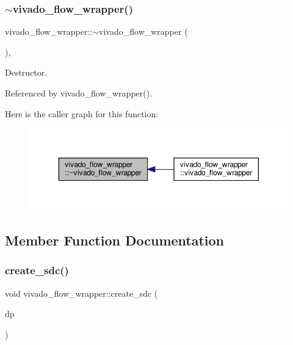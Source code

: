 \subsubsection{\texorpdfstring{$\sim$vivado\+\_\+flow\+\_\+wrapper()}{~vivado\_flow\_wrapper()}}
{\footnotesize\ttfamily vivado\+\_\+flow\+\_\+wrapper\+::$\sim$vivado\+\_\+flow\+\_\+wrapper (\begin{DoxyParamCaption}{ }\end{DoxyParamCaption})\hspace{0.3cm}{\ttfamily [override]}, {\ttfamily [default]}}



Destructor. 



Referenced by vivado\+\_\+flow\+\_\+wrapper().

Here is the caller graph for this function\+:
\nopagebreak
\begin{figure}[H]
\begin{center}
\leavevmode
\includegraphics[width=350pt]{d0/da9/classvivado__flow__wrapper_ace094834eb7a691e72b05f93acd2ea8e_icgraph}
\end{center}
\end{figure}


\subsection{Member Function Documentation}
\mbox{\label{classvivado__flow__wrapper_ab5401741a7ebd12993cb8b2115a100c6}} 
\subsubsection{\texorpdfstring{create\+\_\+sdc()}{create\_sdc()}}
{\footnotesize\ttfamily void vivado\+\_\+flow\+\_\+wrapper\+::create\+\_\+sdc (\begin{DoxyParamCaption}\item[{const \hyperlink{DesignParameters_8hpp_ae36bb1c4c9150d0eeecfe1f96f42d157}{Design\+Parameters\+Ref} \&}]{dp }\end{DoxyParamCaption})\hspace{0.3cm}{\ttfamily [private]}}



